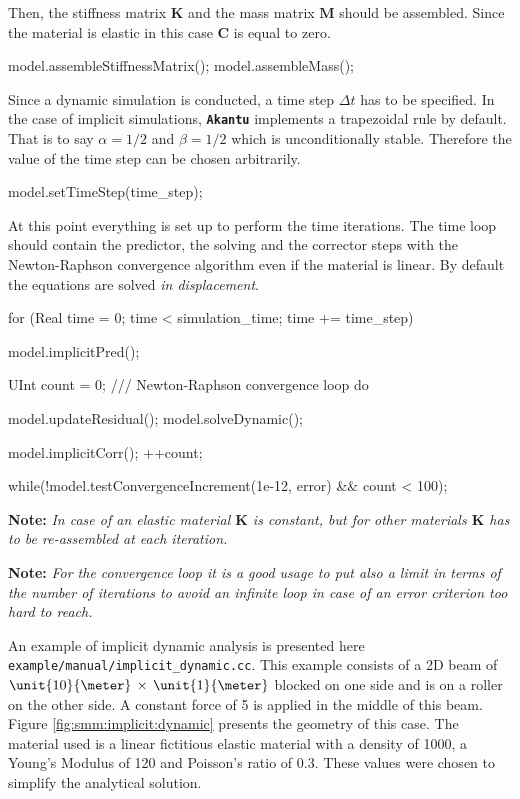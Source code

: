 \documentclass[a4paper,11pt]{book}
\newcommand{\akantu}{{\texttt{\textbf{Akantu}}}\xspace}
\newcommand{\code}[1]{\texttt{#1}}
\newcommand{\note}[1]{\textbf{Note: }\textit{#1}}
\newcommand{\mat}[1]{\ensuremath{\boldsymbol{#1}}}
\begin{document}
Then, the  stiffness matrix  $\mat{K}$ and the  mass matrix $\mat{M}$  should be
assembled.  Since  the material is  elastic in this  case $\mat{C}$ is  equal to
zero.
\begin{cpp}
  model.assembleStiffnessMatrix();
  model.assembleMass();
\end{cpp}

Since  a dynamic  simulation is  conducted, a  time step  $\Delta t$  has  to be
specified. In the case of  implicit simulations, \akantu implements a trapezoidal
rule by  default.  That  is to say  $\alpha =  1/2$ and $\beta  = 1/2$  which is
unconditionally  stable. Therefore  the value  of the  time step  can  be chosen
arbitrarily.  
\begin{cpp}
  model.setTimeStep(time_step);
\end{cpp}

At this point everything is set up to perform the time iterations. The time loop
should  contain the  predictor, the  solving and  the corrector  steps  with the
Newton-Raphson convergence algorithm even if the material is linear.  By default
the        equations       are       solved        \emph{in       displacement}.
\begin{cpp}
  for (Real time = 0; time < simulation_time; time += time_step) {
    model.implicitPred();

    UInt count = 0;
    /// Newton-Raphson convergence loop
    do {
      model.updateResidual();
      model.solveDynamic();

      model.implicitCorr();
      ++count;
    } while(!model.testConvergenceIncrement(1e-12, error) && count < 100);
  }
\end{cpp}

\note{In  case of  an  elastic material  $\mat{K}$  is constant,  but for  other
  materials $\mat{K}$ has to be re-assembled at each iteration.}

\note{For the convergence loop  it is a good usage to put  also a limit in terms
  of the  number of iterations  to avoid  an infinite loop  in case of  an error
  criterion too hard to reach.}

An    example    of    implicit    dynamic   analysis    is    presented    here
\code{example/manual/implicit\_dynamic.cc}.  This example  consists of a 2D beam
of $\unit{10}{\meter}\,\times\,\unit{1}{\meter}$ blocked on one side and is on a
roller on the other side.  A constant force of \unit{5}{\kilo\newton} is applied
in the middle of  this beam.  Figure \ref{fig:smm:implicit:dynamic} presents the
geometry of this case. The material used is a linear fictitious elastic material
with  a density  of  \unit{1000}{\kilogrampercubicmetre}, a  Young's Modulus  of
\unit{120}{\mega\pascal} and Poisson's ratio  of $0.3$. These values were chosen
to simplify the analytical solution.
\end{document}
